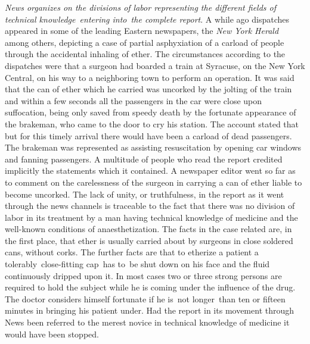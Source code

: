 \documentclass[openany,nobib]{tufte-book}
\begin{document}
\emph{News organizes on the divisions of labor representing the
different fields of technical knowledge~entering into~the complete
report}. A while ago dispatches appeared in some of the leading Eastern
newspapers, the \emph{New York Herald} among others, depicting a case of
partial asphyxiation of a carload of people through the accidental
inhaling of ether. The circumstances according to the dispatches were
that a surgeon had boarded a train at Syracuse, on the New York Central,
on his way to a neighboring town to perform an operation. It was said
that the can of ether which he carried was uncorked by the jolting of
the train and within a few seconds all the passengers in the car were
close upon suffocation, being only saved from speedy death by the
fortunate appearance of the brakeman, who came to the door to cry his
station. The account stated that but for this timely arrival there would
have been a carload of dead passengers. The brakeman was represented as
assisting resuscitation by opening car windows and fanning passengers. A
multitude of people who read the report credited implicitly the
statements which it contained. A newspaper editor went so far as to
comment on the carelessness of the surgeon in carrying a can of ether
liable to become uncorked. The lack of unity, or truthfulness, in the
report as it went through the news channels is traceable to the fact
that there was no division of labor in its treatment by a man having
technical knowledge of medicine and the well-known conditions of
anaesthetization. The facts in the case related are, in the first place,
that ether is usually carried about by surgeons in close soldered cans,
without corks. The further facts are that to etherize a patient a
tolerably~close-fitting cap~has to~be shut down on his face and the
fluid continuously dripped upon it. In most cases two or three strong
persons are required to hold the subject while he is coming under the
influence of the drug. The doctor considers himself fortunate if he
is~not longer~than ten or fifteen minutes in bringing his patient under.
Had the report in its movement through News been referred to the merest
novice in technical knowledge of medicine it would have been stopped.~
\end{document}

